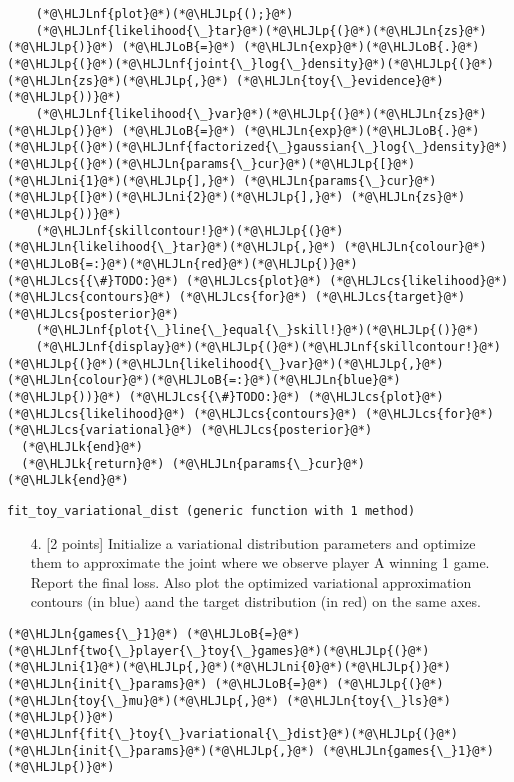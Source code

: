 \documentclass[12pt,a4paper]{article}
\newcommand{\HLJLk}[1]{\textcolor[RGB]{148,91,176}{\textbf{#1}}}
\newcommand{\HLJLn}[1]{#1}
\newcommand{\HLJLnf}[1]{\textcolor[RGB]{66,102,213}{#1}}
\newcommand{\HLJLni}[1]{\textcolor[RGB]{59,151,46}{#1}}
\newcommand{\HLJLoB}[1]{\textcolor[RGB]{102,102,102}{\textbf{#1}}}
\newcommand{\HLJLp}[1]{#1}
\newcommand{\HLJLcs}[1]{\textcolor[RGB]{153,153,119}{\textit{#1}}}
\begin{document}
\begin{lstlisting}
    (*@\HLJLnf{plot}@*)(*@\HLJLp{();}@*)
    (*@\HLJLnf{likelihood{\_}tar}@*)(*@\HLJLp{(}@*)(*@\HLJLn{zs}@*)(*@\HLJLp{)}@*) (*@\HLJLoB{=}@*) (*@\HLJLn{exp}@*)(*@\HLJLoB{.}@*)(*@\HLJLp{(}@*)(*@\HLJLnf{joint{\_}log{\_}density}@*)(*@\HLJLp{(}@*)(*@\HLJLn{zs}@*)(*@\HLJLp{,}@*) (*@\HLJLn{toy{\_}evidence}@*)(*@\HLJLp{))}@*)
    (*@\HLJLnf{likelihood{\_}var}@*)(*@\HLJLp{(}@*)(*@\HLJLn{zs}@*)(*@\HLJLp{)}@*) (*@\HLJLoB{=}@*) (*@\HLJLn{exp}@*)(*@\HLJLoB{.}@*)(*@\HLJLp{(}@*)(*@\HLJLnf{factorized{\_}gaussian{\_}log{\_}density}@*)(*@\HLJLp{(}@*)(*@\HLJLn{params{\_}cur}@*)(*@\HLJLp{[}@*)(*@\HLJLni{1}@*)(*@\HLJLp{],}@*) (*@\HLJLn{params{\_}cur}@*)(*@\HLJLp{[}@*)(*@\HLJLni{2}@*)(*@\HLJLp{],}@*) (*@\HLJLn{zs}@*)(*@\HLJLp{))}@*)
    (*@\HLJLnf{skillcontour!}@*)(*@\HLJLp{(}@*)(*@\HLJLn{likelihood{\_}tar}@*)(*@\HLJLp{,}@*) (*@\HLJLn{colour}@*)(*@\HLJLoB{=:}@*)(*@\HLJLn{red}@*)(*@\HLJLp{)}@*) (*@\HLJLcs{{\#}TODO:}@*) (*@\HLJLcs{plot}@*) (*@\HLJLcs{likelihood}@*) (*@\HLJLcs{contours}@*) (*@\HLJLcs{for}@*) (*@\HLJLcs{target}@*) (*@\HLJLcs{posterior}@*)
    (*@\HLJLnf{plot{\_}line{\_}equal{\_}skill!}@*)(*@\HLJLp{()}@*)
    (*@\HLJLnf{display}@*)(*@\HLJLp{(}@*)(*@\HLJLnf{skillcontour!}@*)(*@\HLJLp{(}@*)(*@\HLJLn{likelihood{\_}var}@*)(*@\HLJLp{,}@*) (*@\HLJLn{colour}@*)(*@\HLJLoB{=:}@*)(*@\HLJLn{blue}@*)(*@\HLJLp{))}@*) (*@\HLJLcs{{\#}TODO:}@*) (*@\HLJLcs{plot}@*) (*@\HLJLcs{likelihood}@*) (*@\HLJLcs{contours}@*) (*@\HLJLcs{for}@*) (*@\HLJLcs{variational}@*) (*@\HLJLcs{posterior}@*)
  (*@\HLJLk{end}@*)
  (*@\HLJLk{return}@*) (*@\HLJLn{params{\_}cur}@*)
(*@\HLJLk{end}@*)
\end{lstlisting}

\begin{lstlisting}
fit_toy_variational_dist (generic function with 1 method)
\end{lstlisting}


\begin{itemize}
\item[4. ] [2 points] Initialize a variational distribution parameters and optimize them to approximate the joint where we observe player A winning 1 game. Report the final loss. Also plot the optimized variational approximation contours (in blue) aand the target distribution (in red) on the same axes.

\end{itemize}

\begin{lstlisting}
(*@\HLJLn{games{\_}1}@*) (*@\HLJLoB{=}@*) (*@\HLJLnf{two{\_}player{\_}toy{\_}games}@*)(*@\HLJLp{(}@*)(*@\HLJLni{1}@*)(*@\HLJLp{,}@*)(*@\HLJLni{0}@*)(*@\HLJLp{)}@*)
(*@\HLJLn{init{\_}params}@*) (*@\HLJLoB{=}@*) (*@\HLJLp{(}@*)(*@\HLJLn{toy{\_}mu}@*)(*@\HLJLp{,}@*) (*@\HLJLn{toy{\_}ls}@*)(*@\HLJLp{)}@*)
(*@\HLJLnf{fit{\_}toy{\_}variational{\_}dist}@*)(*@\HLJLp{(}@*)(*@\HLJLn{init{\_}params}@*)(*@\HLJLp{,}@*) (*@\HLJLn{games{\_}1}@*)(*@\HLJLp{)}@*)
\end{lstlisting}
\end{document}

